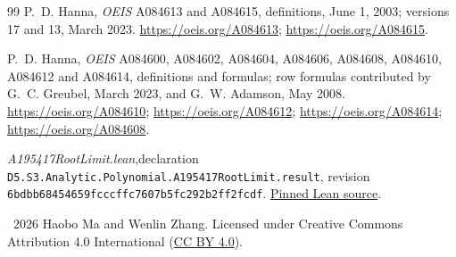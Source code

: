 \documentclass[11pt]{article}
\begin{document}
\begin{thebibliography}{99}
P.~D. Hanna, \emph{OEIS} A084613 and A084615, definitions,
June 1, 2003; versions 17 and 13, March 2023.
\url{https://oeis.org/A084613}; \url{https://oeis.org/A084615}.

P.~D. Hanna, \emph{OEIS} A084600, A084602, A084604, A084606,
A084608, A084610, A084612 and A084614, definitions and formulas;
row formulas contributed by G.~C. Greubel, March 2023, and
G.~W. Adamson, May 2008.
\url{https://oeis.org/A084610}; \url{https://oeis.org/A084612};
\url{https://oeis.org/A084614}; \url{https://oeis.org/A084608}.

\emph{A195417RootLimit.lean},\newline declaration
\texttt{D5.S3.Analytic.Polynomial.A195417RootLimit.result},
revision \texttt{6bdbb68454659fcccffc7607b5fc292b2ff2fcdf}.
\href{https://github.com/the-omega-institute/trureturing/blob/6bdbb68454659fcccffc7607b5fc292b2ff2fcdf/D5/S3/Analytic/Polynomial/A195417RootLimit.lean}{Pinned Lean source}.
\end{thebibliography}
\bigskip
\noindent\small\textcopyright\ 2026 Haobo Ma and Wenlin Zhang.
Licensed under Creative Commons Attribution 4.0 International
(\href{https://creativecommons.org/licenses/by/4.0/}{CC BY 4.0}).
\end{document}
